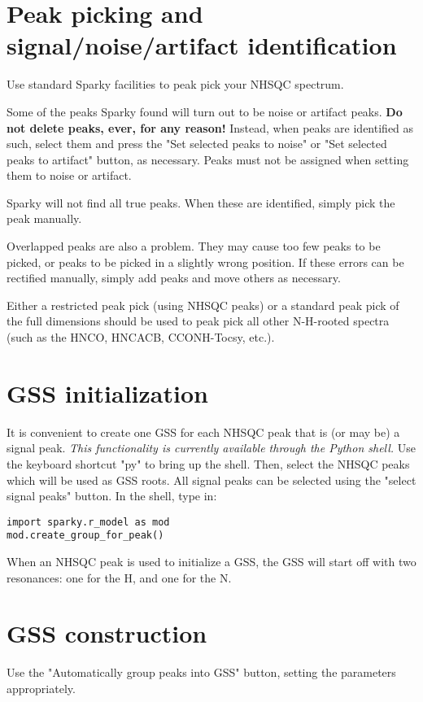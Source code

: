 \documentclass[11pt,a4paper]{article}
\begin{document}
\section{Peak picking and signal/noise/artifact identification}
Use standard Sparky facilities to peak pick your NHSQC spectrum.

Some of the peaks Sparky found will turn out to be noise or artifact peaks.
\textbf{Do not delete peaks, ever, for any reason!}  Instead,
when peaks are identified as such, select them and press the "Set selected 
peaks to noise" or "Set selected peaks to artifact" button, as necessary.
Peaks must not be assigned when setting them to noise or artifact.

Sparky will not find all true peaks.  When these are identified, simply
pick the peak manually.

Overlapped peaks are also a problem.  They may cause too few peaks to be 
picked, or peaks to be picked in a slightly wrong position.  If these errors
can be rectified manually, simply add peaks and move others as necessary.

Either a restricted peak pick (using NHSQC peaks) or a standard peak pick
of the full dimensions should be used to peak pick all other N-H-rooted
spectra (such as the HNCO, HNCACB, CCONH-Tocsy, etc.).


\section{GSS initialization}
It is convenient to create one GSS for each NHSQC peak that is (or may be)
a signal peak.  \textit{This functionality is currently available through
the Python shell.}  Use the keyboard shortcut "py" to bring up the shell.
Then, select the NHSQC peaks which will be used as GSS roots.  
All signal peaks can be selected using the "select signal peaks" button.
In the shell, type in:
\begin{verbatim}
import sparky.r_model as mod
mod.create_group_for_peak()
\end{verbatim}

When an NHSQC peak is used to initialize a GSS, the GSS will start off
with two resonances: one for the H, and one for the N.


\section{GSS construction}
Use the "Automatically group peaks into GSS" button, setting the parameters
appropriately.
\end{document}
